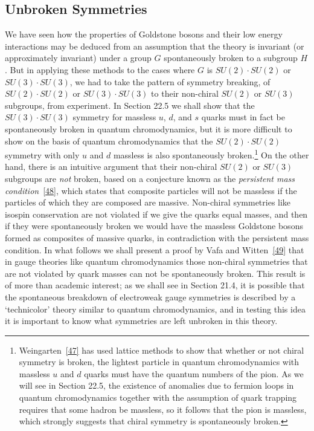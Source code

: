 \subsection{Unbroken Symmetries}
\label{sec:19.9}

We have seen how the properties of Goldstone bosons and their low energy interactions may be deduced from an assumption that the theory is invariant (or approximately invariant) under a group $G$ spontaneously broken to a subgroup $H$. But in applying these methods to the cases where $G$ is $SU(2)\cdot SU(2)$ or $SU(3)\cdot SU(3)$, we had to take the pattern of symmetry breaking, of $SU(2)\cdot SU(2)$ or $SU(3)\cdot SU(3)$ to their non-chiral $SU(2)$ or $SU(3)$ subgroups, from experiment. In Section 22.5 we shall show that the $SU(3)\cdot SU(3)$ symmetry for massless $u$, $d$, and $s$ quarks must in fact be spontaneously broken in quantum chromodynamics, but it is more difficult to show on the basis of quantum chromodynamics that the $SU(2)\cdot SU(2)$ symmetry with only $u$ and $d$ massless is also spontaneously broken.\footnote{Weingarten~\hyperref[ch19-ref-47]{[47]} has used lattice methods to show that whether or not chiral symmetry is broken, the lightest particle in quantum chromodynamics with massless $u$ and $d$ quarks must have the quantum numbers of the pion. As we will see in Section 22.5, the existence of anomalies due to fermion loops in quantum chromodynamics together with the assumption of quark trapping requires that some hadron be massless, so it follows that the pion is massless, which strongly suggests that chiral symmetry is spontaneously broken.} On the other hand, there is an intuitive argument that their non-chiral $SU(2)$ or $SU(3)$ subgroups are \emph{not} broken, based on a conjecture known as the \emph{persistent mass condition}~\hyperref[ch19-ref-48]{[48]}, which states that composite particles will not be massless if the particles of which they are composed are massive. Non-chiral symmetries like isospin conservation are not violated if we give the quarks equal masses, and then if they were spontaneously broken we would have the massless Goldstone bosons formed as composites of massive quarks, in contradiction with the persistent mass condition. In what follows we shall present a proof by Vafa and Witten~\hyperref[ch19-ref-49]{[49]} that in gauge theories like quantum chromodynamics those non-chiral symmetries that are not violated by quark masses can not be spontaneously broken. This result is of more than academic interest; as we shall see in Section 21.4, it is possible that the spontaneous breakdown of electroweak gauge symmetries is described by a `technicolor' theory similar to quantum chromodynamics, and in testing this idea it is important to know what symmetries are left unbroken in this theory.

